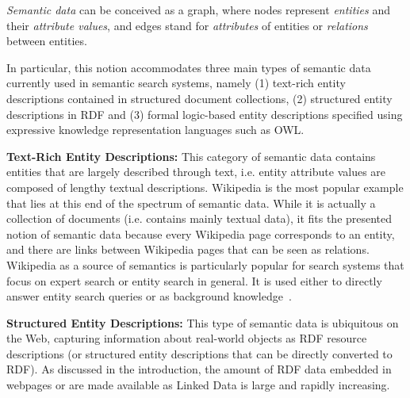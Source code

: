 \begin{definition}
\emph{Semantic data} can be conceived as a graph, where nodes represent \emph{entities} and their \emph{attribute values}, and edges stand for \emph{attributes} of entities or \emph{relations} between entities. 
\end{definition}

In particular, this notion accommodates three main types of semantic data currently used in semantic search systems, namely (1) text-rich entity descriptions contained in structured document collections, (2) structured entity descriptions in RDF and (3) formal logic-based entity descriptions specified using expressive knowledge representation languages such as OWL. 

\textbf{Text-Rich Entity Descriptions:} This category of semantic data contains entities that are largely described through text, i.e. entity attribute values are composed of lengthy textual descriptions. Wikipedia is the most popular example that lies at this end of the spectrum of semantic data. While it is actually a collection of documents (i.e. contains mainly textual data), it fits the presented notion of semantic data because every Wikipedia page corresponds to an entity, and there are links between Wikipedia pages that can be seen as relations. 
Wikipedia as a source of semantics is particularly popular for search systems that focus on expert search or entity search in general. It is used either to directly answer entity search queries or as background knowledge~\cite{DBLP:conf/cikm/KapteinSVK10,DBLP:conf/cikm/BronBR10}. 


\textbf{Structured Entity Descriptions:} This type of semantic data is ubiquitous on the Web, capturing information about real-world objects as RDF resource descriptions (or structured entity descriptions that can be directly converted to RDF). As discussed in the introduction, the amount of RDF data embedded in webpages or are made available as Linked Data is large and rapidly increasing. 



